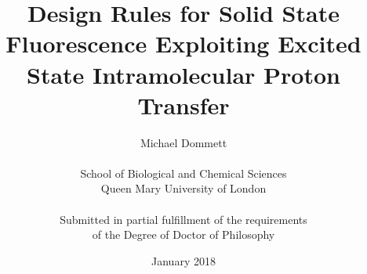 \documentclass[a4paper,11.5pt]{report}
\begin{document}
\setlength{\TPHorizModule}{200mm} 
\setlength{\TPVertModule}{100mm} 
\textblockorigin{61mm}{19mm}






\providecommand{\OT}[1]{\operatorname{\Theta}\bigl(#1\bigr)}
\providecommand{\OOm}[1]{\operatorname{\Omega}\bigl(#1\bigr)}



\title{\huge
\textbf{Design Rules for Solid State Fluorescence Exploiting Excited State Intramolecular Proton Transfer}}
\author{Michael Dommett \\
\\
School of Biological and Chemical Sciences\\
Queen Mary University of London\\
\\
Submitted in partial fulfillment of the requirements\\ of the Degree of Doctor of Philosophy}

\date{January 2018}

\maketitle

  
\setcounter{page}{2}


\tableofcontents
\listoffigures
\listoftables





%
%
%


\appendix
\appendixpage
\setcounter{figure}{0} \renewcommand{\thefigure}{A\arabic{figure}}
\end{document}
